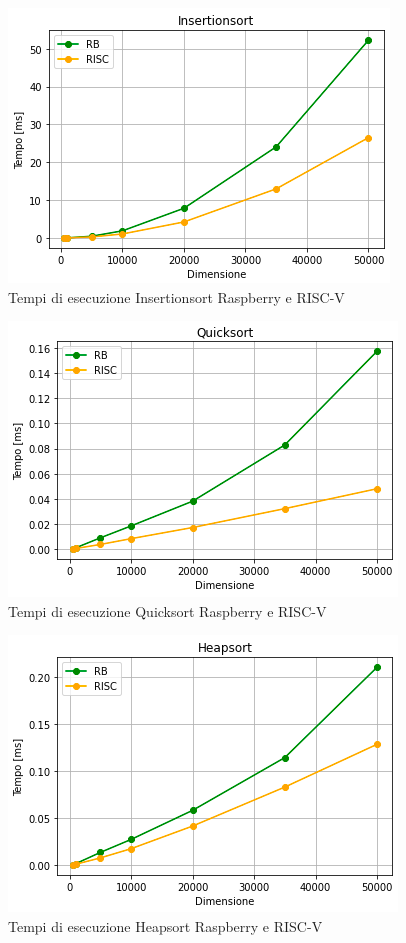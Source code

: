 \documentclass[12pt,a4paper]{report}
\begin{document}
\begin{figure}[ht]
\centering
	\includegraphics[scale=0.8]{Insertionsort_RB_RISC.PNG}
	\caption{Tempi di esecuzione Insertionsort Raspberry e RISC-V}
	\label{GrafInsertion}
\end{figure}
\begin{figure}[ht]
\centering
	\includegraphics[scale=0.8]{Quicksort_RB_RISC.PNG}
	\caption{Tempi di esecuzione Quicksort Raspberry e RISC-V}
	\label{GrafQuick}
\end{figure}
\begin{figure}[ht]
\centering
	\includegraphics[scale=0.8]{Heapsort_RB_RISC.PNG}
	\caption{Tempi di esecuzione Heapsort Raspberry e RISC-V}
	\label{GrafHeap}
\end{figure}
\end{document}
